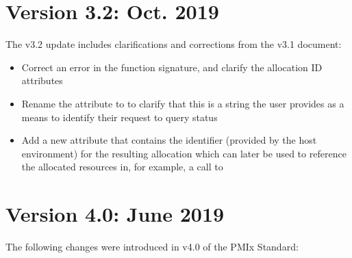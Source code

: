 \section{Version 3.2: Oct. 2019}

The v3.2 update includes clarifications and corrections from the v3.1 document:

\begin{itemize}
    \item Correct an error in the  function signature, and clarify the allocation ID attributes
    \item Rename the  attribute to  to clarify that this is a string the user provides as a means to identify their request to query status
    \item Add a new  attribute that contains the identifier (provided by the host environment) for the resulting allocation which can later be used to reference the allocated resources in, for example, a call to 
\end{itemize}


\section{Version 4.0: June 2019}

The following changes were introduced in v4.0 of the PMIx Standard:

